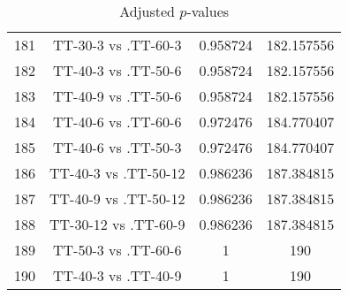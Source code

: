 \documentclass[a4paper,10pt]{article}
\begin{document}
\begin{landscape}
\begin{table}[!htp]
\begin{tabular}{cccc}
181&TT-30-3 vs .TT-60-3&0.958724&182.157556\\
182&TT-40-3 vs .TT-50-6&0.958724&182.157556\\
183&TT-40-9 vs .TT-50-6&0.958724&182.157556\\
184&TT-40-6 vs .TT-60-6&0.972476&184.770407\\
185&TT-40-6 vs .TT-50-3&0.972476&184.770407\\
186&TT-40-3 vs .TT-50-12&0.986236&187.384815\\
187&TT-40-9 vs .TT-50-12&0.986236&187.384815\\
188&TT-30-12 vs .TT-60-9&0.986236&187.384815\\
189&TT-50-3 vs .TT-60-6&1&190\\
190&TT-40-3 vs .TT-40-9&1&190\\
\hline
\end{tabular}
\caption{Adjusted $p$-values}
\end{table}

\end{landscape}
\end{document}
